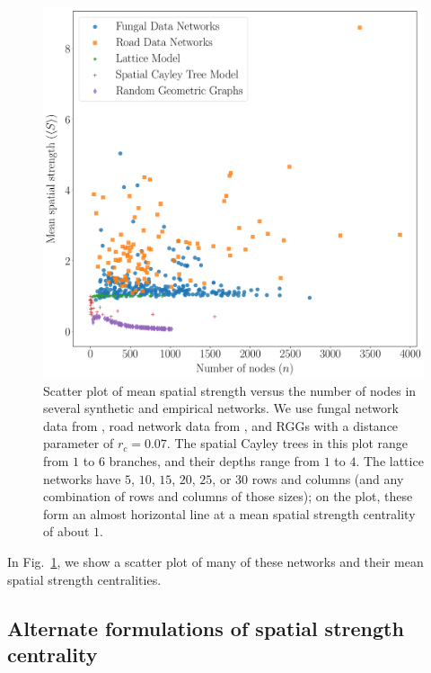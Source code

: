 \documentclass[%
 reprint,
 amsmath,amssymb,
 aps,
]{revtex4-1}
\begin{document}
\begin{figure}
    \centering
    \includegraphics[width=1.0\linewidth]{spatial_scatter_1.pdf}
    \caption{Scatter plot of mean spatial strength versus the number of nodes in several synthetic and empirical networks. We use fungal network data from \cite{fungal_data}, road network data from \cite{road_data}, and RGGs with a distance parameter of $r_c = 0.07$. The spatial Cayley trees in this plot range from $1$ to $6$ branches, and their depths range from $1$ to $4$. The lattice networks have $5$, $10$, $15$, $20$, $25$, or $30$ rows and columns (and any combination of rows and columns of those sizes); on the plot, these form an almost horizontal line at a mean spatial strength centrality of about $1$.
    }
    \label{fig:spatial_distributions}
\end{figure}


In Fig.~\ref{fig:spatial_distributions}, we show a scatter plot of many of these networks and their mean spatial strength centralities.


\subsection{Alternate formulations of spatial strength centrality}\label{sec:alternate_formations}
\end{document}
